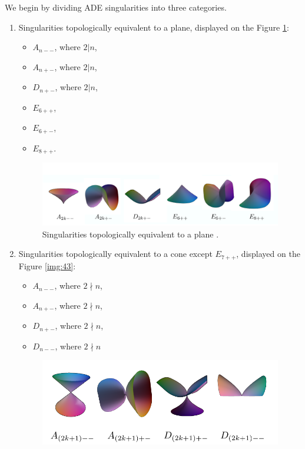 We begin by dividing ADE singularities into three categories.
\begin{enumerate}
    \item Singularities topologically equivalent to a plane, displayed on the Figure \ref{img:42}:
    \begin{itemize}
        \item $A_{n--}$, where $2|n$,
        \item $A_{n+-}$, where $2|n$,
        \item $D_{n+-}$, where $2|n$,
        \item $E_{6++}$, 
        \item $E_{6+-}$,
        \item $E_{8++}$.
    \end{itemize}
    \begin{figure}
        \centerline{\includegraphics[scale=0.5]{images/img42}}
        \caption[Singularities topologically equivalent to a plane]
        {Singularities topologically equivalent to a plane \cite{morris2003client}.}
        \label{img:42}
    \end{figure}
    \item Singularities topologically equivalent to a cone except $E_{7++}$, displayed on the Figure \ref{img:43}:
    \begin{itemize}
        \item $A_{n--}$, where $2 \nmid n$,
        \item $A_{n+-}$, where $2 \nmid n$,
        \item $D_{n+-}$, where $2 \nmid n$,
        \item $D_{n--}$, where $2 \nmid n$
    \end{itemize}
    \begin{figure}
        \centerline{\includegraphics[scale=0.5]{images/img43}}

\end{figure}
\end{enumerate}
